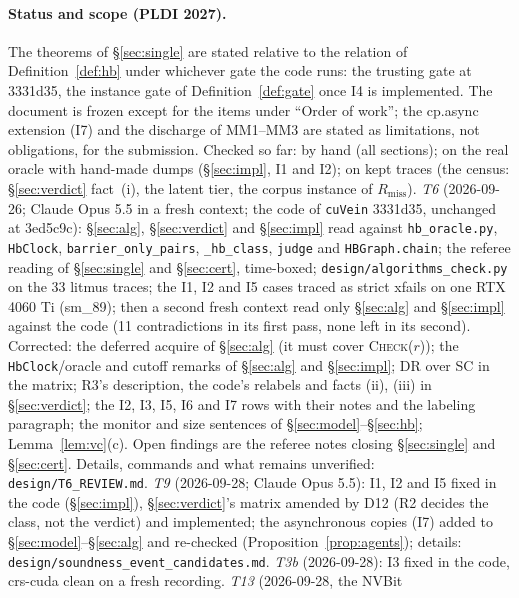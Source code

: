 \documentclass[11pt]{article}
\theoremstyle{remark}
\begin{document}
\paragraph{Status and scope (PLDI 2027).} The theorems of \S\ref{sec:single} are stated
relative to the relation of Definition~\ref{def:hb} under whichever gate the code runs:
the trusting gate at 3331d35, the instance gate of Definition~\ref{def:gate} once I4 is
implemented. The document is frozen except for the items under ``Order of work''; the
cp.async extension (I7) and the discharge of MM1--MM3 are stated as limitations, not
obligations, for the submission. Checked so far: by hand (all sections); on the real
oracle with hand-made dumps (\S\ref{sec:impl}, I1 and I2); on kept traces (the census:
\S\ref{sec:verdict} fact~(i), the latent tier, the corpus instance of $R_{\mathrm{miss}}$).
\emph{T6} (2026-09-26; Claude Opus 5.5 in a fresh context; the code of \texttt{cuVein}
3331d35, unchanged at 3ed5c9c): \S\ref{sec:alg}, \S\ref{sec:verdict} and \S\ref{sec:impl}
read against \texttt{hb\_oracle.py}, \texttt{HbClock}, \texttt{barrier\_only\_pairs},
\texttt{\_hb\_class}, \texttt{judge} and \texttt{HBGraph.chain}; the referee reading of
\S\ref{sec:single} and \S\ref{sec:cert}, time-boxed; \texttt{design/algorithms\_check.py} on
the 33 litmus traces; the I1, I2 and I5 cases traced as strict xfails on one RTX 4060 Ti
(sm\_89); then a second fresh context read only \S\ref{sec:alg} and \S\ref{sec:impl}
against the code (11 contradictions in its first pass, none left in its second). Corrected:
the deferred acquire of \S\ref{sec:alg} (it must cover \textsc{Check}($r$)); the \texttt{HbClock}/oracle
and cutoff remarks of \S\ref{sec:alg} and \S\ref{sec:impl}; DR over SC in the matrix; R3's
description, the code's relabels and facts (ii), (iii) in \S\ref{sec:verdict}; the I2, I3,
I5, I6 and I7 rows with their notes and the labeling paragraph; the monitor and size
sentences of \S\ref{sec:model}--\S\ref{sec:hb}; Lemma~\ref{lem:vc}(c). Open findings are the
referee notes closing \S\ref{sec:single} and \S\ref{sec:cert}. Details, commands and what
remains unverified: \texttt{design/T6\_REVIEW.md}. \emph{T9} (2026-09-28; Claude Opus 5.5):
I1, I2 and I5 fixed in the code (\S\ref{sec:impl}), \S\ref{sec:verdict}'s matrix amended by
D12 (R2 decides the class, not the verdict) and implemented; the asynchronous copies (I7)
added to \S\ref{sec:model}--\S\ref{sec:alg} and re-checked (Proposition~\ref{prop:agents});
details: \texttt{design/soundness\_event\_candidates.md}. \emph{T3b} (2026-09-28): I3
fixed in the code, crs-cuda clean on a fresh recording. \emph{T13} (2026-09-28, the NVBit
\end{document}
